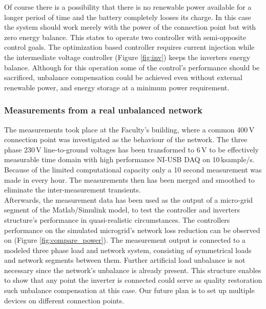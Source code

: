 %
        Of course there is a possibility that there is no renewable power available for a longer period of time and the battery completely looses its charge. In this case the system should work merely with the power of the connection point but with  zero energy balance. This states to operate two controller with semi-opposite control goals. The optimization based controller requires current injection while the intermediate voltage controller (Figure \ref{fig:inv}) keeps the inverters energy balance. Although for this operation some of the control's performance should be sacrificed, unbalance compensation could be achieved even without external renewable power, and energy storage at a minimum power requirement.
%

        \subsubsection{Measurements from a real unbalanced network}

            The measurements took place at the Faculty's building, where a common 400\,V connection point was investigated as the behaviour of the network. The three phase 230\,V line-to-ground voltages has been transformed to 6\,V to be effectively measurable time domain with high performance NI-USB DAQ on 10\,ksample/s. Because of the limited computational capacity only a 10 second measurement was made in every hour.  The measurements then has been merged and smoothed to eliminate the inter-measurement transients.\\
            Afterwards, the measurement data has been used as the output of a micro-grid segment of the Matlab/Simulink model, to test the controller and inverters structure's performance in quasi-realistic circumstances. The controllers performance on the simulated microgrid's network loss reduction can be observed on (Figure \ref{fig:compare_power}). The measurement output is connected to a modeled three phase load and network system, consisting of symmetrical loads and network segments between them. Further artificial load unbalance is not necessary since the network's unbalance is already present. This structure enables to show that any point the inverter is connected could serve as quality restoration such unbalance compensation at this case. Our future plan is to set up multiple devices on different connection points.



